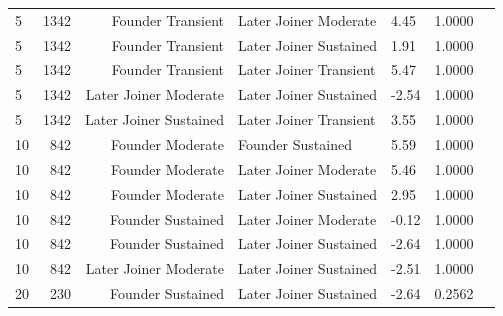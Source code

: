\begin{table}[H]
\begin{tabular}{l r r l l r r}
5 & 1342 & Founder Transient & Later Joiner Moderate & 4.45 & 1.0000 \\ 
5 & 1342 & Founder Transient & Later Joiner Sustained & 1.91 & 1.0000 \\ 
5 & 1342 & Founder Transient & Later Joiner Transient & 5.47 & 1.0000 \\ 
5 & 1342 & Later Joiner Moderate & Later Joiner Sustained & -2.54 & 1.0000 \\ 
5 & 1342 & Later Joiner Sustained & Later Joiner Transient & 3.55 & 1.0000 \\ 
10 & 842 & Founder Moderate & Founder Sustained & 5.59 & 1.0000 \\ 
10 & 842 & Founder Moderate & Later Joiner Moderate & 5.46 & 1.0000 \\ 
10 & 842 & Founder Moderate & Later Joiner Sustained & 2.95 & 1.0000 \\ 
10 & 842 & Founder Sustained & Later Joiner Moderate & -0.12 & 1.0000 \\ 
10 & 842 & Founder Sustained & Later Joiner Sustained & -2.64 & 1.0000 \\ 
10 & 842 & Later Joiner Moderate & Later Joiner Sustained & -2.51 & 1.0000 \\ 
20 & 230 & Founder Sustained & Later Joiner Sustained & -2.64 & 0.2562 \\ 
\bottomrule
\end{tabular}%
\label{tab:codebase_graph_latex_repository_graph_component_time_series_holm_bonferroni_no_sig_five_and_tenclasses} 
\end{table}
\newpage 
